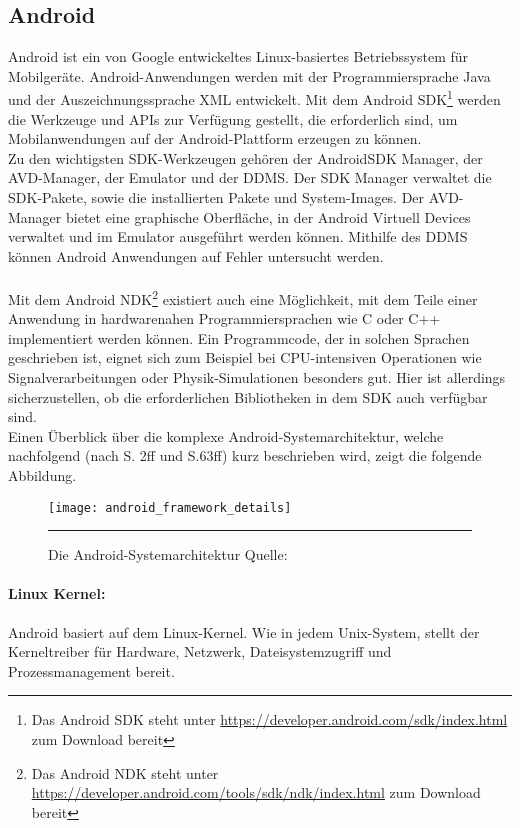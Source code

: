 \subsection{Android}
Android ist ein von Google entwickeltes Linux-basiertes Betriebssystem für Mobilgeräte. 
Android-Anwendungen werden mit der Programmiersprache Java und der Auszeichnungssprache \gls{XML} entwickelt. Mit dem Android \gls{SDK}\footnote{ Das Android \gls{SDK} steht unter \url{https://developer.android.com/sdk/index.html} zum Download bereit} werden die Werkzeuge und \glspl{API} zur Verfügung gestellt, die erforderlich sind, um Mobilanwendungen auf der Android-Plattform erzeugen zu können.\\ 
Zu den wichtigsten \gls{SDK}-Werkzeugen gehören der Android\gls{SDK} Manager, der AVD-Manager, der Emulator und der \gls{DDMS}. Der \gls{SDK} Manager verwaltet die \gls{SDK}-Pakete, sowie die installierten Pakete und System-Images. Der AVD-Manager bietet eine graphische Oberfläche, in der Android Virtuell Devices verwaltet und im Emulator ausgeführt werden können. Mithilfe des \gls{DDMS} können Android Anwendungen auf Fehler untersucht werden. \cite{android_sdk} \\\\
Mit dem Android \gls{NDK}\footnote{ Das Android \gls{NDK} steht unter \url{https://developer.android.com/tools/sdk/ndk/index.html} zum Download bereit} existiert auch eine Möglichkeit, mit dem Teile einer Anwendung in hardwarenahen Programmiersprachen wie C oder C++ implementiert werden können. Ein Programmcode, der in solchen Sprachen geschrieben ist, eignet sich zum Beispiel bei CPU-intensiven Operationen wie Signalverarbeitungen oder Physik-Simulationen besonders gut. Hier ist allerdings sicherzustellen, ob die erforderlichen Bibliotheken in dem \gls{SDK} auch verfügbar sind. \cite{android_ndk} \\
Einen Überblick über die komplexe Android-Systemarchitektur, welche nachfolgend (nach \cite{android} S. 2ff und \cite{androidVM} S.63ff) kurz beschrieben wird, zeigt die folgende Abbildung.
\begin{figure}[H]  
    \centering  
    \texttt{[image: android\_framework\_details]} 
    \rule{35em}{0.5pt}
    \caption[Android-Systemarchitektur]{Die Android-Systemarchitektur Quelle: \cite{android_fig}}
    \label{fig:android}
\end{figure}
\paragraph{Linux Kernel: }
Android basiert auf dem Linux-Kernel. Wie in jedem Unix-System, stellt der Kerneltreiber für Hardware, Netzwerk, Dateisystemzugriff und Prozessmanagement bereit.
